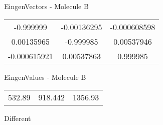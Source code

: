 \begin{multicols}{2}
\begin{center}
\vtab
 EingenVectors - Molecule B     \\
\vtab
\begin{tabular}{|c c c|}
-0.999999	 & 	-0.00136295	 & 	-0.000608598	 \\
0.00135965	 & 	-0.999985	 & 	0.00537946	 \\
-0.000615921	 & 	0.00537863	 & 	0.999985
\end{tabular}

\vtab
 EingenValues - Molecule B     \\
\vtab
\begin{tabular}{|c c c|}
532.89	 & 	918.442	 & 	1356.93	 \\
\end{tabular}

\end{center}
\end{multicols}
\begin{center}
\vtab
\vtab
\textcolor{NavyBlue}{\Large Different}
\end{center}

 \newpage

